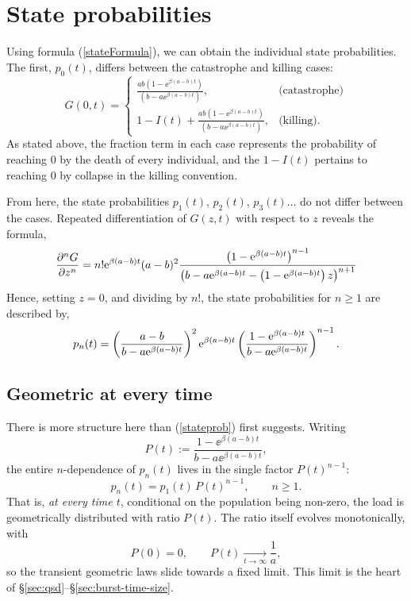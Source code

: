 \section{State probabilities}
\label{sec:state-probs}

Using formula (\ref{stateFormula}), we can obtain the individual state
probabilities. The first, $p_0(t)$, differs between the catastrophe and
killing cases:
$$G(0 , t) = \begin{cases}
\frac{ab(1-\ee^{\beta(a-b) t})  } {  (b-a\ee^{\beta(a-b) t})   }, & \text{(catastrophe)}\\
1 - I(t) + \frac{ab(1-\ee^{\beta(a-b) t})  } {  (b-a\ee^{\beta(a-b) t})   }, & \text{(killing).}
\end{cases}$$
As stated above, the fraction term in each case represents the probability
of reaching $0$ by the death of every individual, and the $1-I(t)$ pertains
to reaching $0$ by collapse in the killing convention. \par
From here, the state probabilities $p_1(t)$, $p_2(t)$, $p_3(t)\dots$ do not
differ between the cases. Repeated differentiation of $G(z,t)$ with respect
to $z$ reveals the formula,
$$\frac{\partial^n G}{\partial z^n} =n! {\rm e}^{\beta(a-b)t}(a-b)^2  \frac{\left(1-{\rm e}^{\beta(a-b)t}\right)^ {n-1} }{\left( b - a{\rm e}^{\beta(a-b)t} - \left(1-{\rm e}^{\beta(a-b)t}\right) z\right) ^ {n+1}} $$
Hence, setting $z=0$, and dividing by $n!$, the state probabilities for
$n\geq1$ are described by,
\begin{equation}
\label{stateprob}
p_n(t) =\left( \frac{ a-b }{{b - a{\rm e}^{\beta(a-b)t}}}\right)^2 {\rm e}^{\beta(a-b)t} \left(\frac{{1-{\rm e}^{\beta(a-b)t}}}{{b - a{\rm e}^{\beta(a-b)t}} } \right)^{n-1}.
\end{equation}

\subsection{Geometric at every time}
\label{sec:geometric-every-time}

There is more structure here than (\ref{stateprob}) first suggests. Writing
\begin{equation}
P(t):=\frac{1-\ee^{\beta(a-b)t}}{b-a\ee^{\beta(a-b)t}},
\label{eq:Pdef}
\end{equation}
the entire $n$-dependence of $p_n(t)$ lives in the single factor
$P(t)^{n-1}$:
\begin{equation}
p_n(t)=p_1(t)\,P(t)^{n-1},\qquad n\ge1.
\end{equation}
That is, \emph{at every time $t$}, conditional on the population being
non-zero, the load is geometrically distributed with ratio $P(t)$. The ratio
itself evolves monotonically, with
\begin{equation}
P(0)=0,\qquad P(t)\xrightarrow[t\to\infty]{}\frac{1}{a},
\end{equation}
so the transient geometric laws slide towards a fixed limit. This limit is
the heart of \S\ref{sec:qsd}--\S\ref{sec:burst-time-size}.

